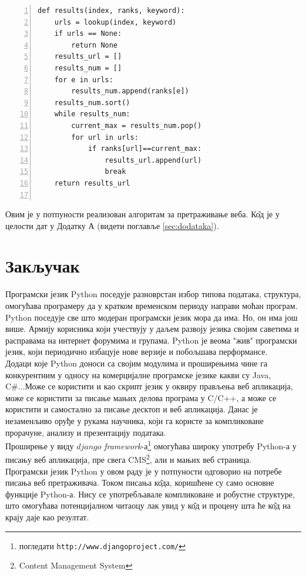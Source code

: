 \documentclass[11pt, serbianc, english, titlepage]{article}
\begin{document}
		\begin{lstlisting}[caption=Функција која враћа најбољи резултат, label={lst:results}, numbers=left]
def results(index, ranks, keyword):
    urls = lookup(index, keyword)
    if urls == None:
        return None
    results_url = []    
    results_num = []
    for e in urls:
        results_num.append(ranks[e])
    results_num.sort()
    while results_num:
        current_max = results_num.pop()
        for url in urls:
            if ranks[url]==current_max:
                results_url.append(url)
                break
    return results_url
      
		\end{lstlisting}
		Овим је у потпуности реализован алгоритам за претраживање веба. К\^{о}д је у целости дат у Додатку А (видети поглавље \ref{sec:dodataka}).
\section{Закључак}
Програмски језик Python поседује разноврстан избор типова података, структура, омогућава програмеру да у кратком временском периоду направи моћан програм. Python поседује све што модеран програмски језик мора да има. Но, он има још више. Армију корисника који учествују у даљем развоју језика својим саветима и расправама на интернет форумима и групама. Python је веома "жив" програмски језик, који периодично избацује нове верзије и побољшава перформансе. \\
		Додаци које Python доноси са својим модулима и проширењима чине га конкурентним у односу на комерцијалне програмске језике какви су Java, C\#...Може се користити и као скрипт језик у оквиру прављења веб апликација, може се користити за писање мањих делова програма у C/C++, а може се користити и самостално за писање десктоп и веб апликација. Данас је незаменљиво оруђе у рукама научника, који га користе за компликоване прорачуне, анализу и презентацију података. \\
		Проширење у виду $django$ \emph{framework}-а\footnote{погледати \texttt{http://www.djangoproject.com/}} омогућава широку употребу Python-а у писању веб апликација, пре свега CMS\footnote{Content Management System}, али и мањих веб страница. \\
		Програмски језик Python у овом раду је у потпуности одговорио на потребе писања веб претраживача. Током писања к\^{о}да, коришћене су само основне функције Python-а. Нису се употребљавале компликоване и робустне структуре, што омогућава потенцијалном читаоцу лак увид у к\^{о}д и процену шта ће к\^{о}д на крају даје као резултат.\\
\end{document}
